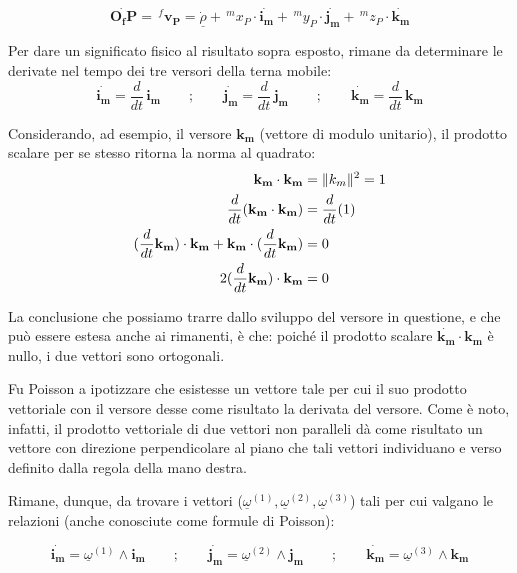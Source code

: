 				\begin{equation*}
					\dot{\mathbf{O_fP}} = \,^f\mathbf{v_P} = \dot{\underline{\rho}} + \,^mx_P \cdot \dot{\mathbf{i_m}} + \,^my_P \cdot \dot{\mathbf{j_m}} + \,^mz_P \cdot \dot{\mathbf{k_m}}
				\end{equation*}
		
		Per dare un significato fisico al risultato sopra esposto, rimane da determinare le derivate nel tempo dei tre versori della terna mobile:
		\[ \dot{\mathbf{i_m}} = \frac{d}{dt} \,{\mathbf{i_m}} \qquad ; \qquad \dot{\mathbf{j_m}} = \frac{d}{dt} \,{\mathbf{j_m}}  \qquad ; \qquad \dot{\mathbf{k_m}} = \frac{d}{dt} \,{\mathbf{k_m}} \]

		Considerando, ad esempio, il versore $\mathbf{k_m}$ (vettore di modulo unitario), il prodotto scalare per se stesso ritorna la norma al quadrato:
		\begin{equation*}
		\begin{split}
			\mathbf{k_m} \cdot \mathbf{k_m} &= \lVert k_m\rVert^2 = 1\\
			\frac{d}{dt} (\mathbf{k_m} \cdot \mathbf{k_m}) &= \frac{d}{dt}(1)\\
			(\frac{d}{dt}\mathbf{k_m}) \cdot  \mathbf{k_m} +  \mathbf{k_m} \cdot (\frac{d}{dt}\mathbf{k_m}) &= 0\\
			2 (\frac{d}{dt}\mathbf{k_m}) \cdot \mathbf{k_m} &= 0
		\end{split}
		\end{equation*}
		
		La conclusione che possiamo trarre dallo sviluppo del versore in questione, e che può essere estesa anche ai rimanenti, è che: poiché il prodotto scalare $ \dot{\mathbf{k_m}} \cdot \mathbf{k_m}$ è nullo, i due vettori sono ortogonali.
		
		Fu Poisson a ipotizzare che esistesse un vettore tale per cui il suo prodotto vettoriale con il versore desse come risultato la derivata del versore. Come è noto, infatti, il prodotto vettoriale di due vettori non paralleli dà come risultato un vettore con direzione perpendicolare al piano che tali vettori individuano e verso definito dalla regola della mano destra.
		
		Rimane, dunque, da trovare i vettori ($\underline{\omega}^{(1)}, \underline{\omega}^{(2)}, \underline{\omega}^{(3)}$) tali per cui valgano le relazioni (anche conosciute come formule di Poisson):
		
		\[ \dot{\mathbf{i_m}} = \underline{\omega}^{(1)} \wedge{\mathbf{i_m}} \qquad ; \qquad \dot{\mathbf{j_m}} =\underline{\omega}^{(2)} \wedge {\mathbf{j_m}}  \qquad ; \qquad \dot{\mathbf{k_m}} = \underline{\omega}^{(3)} \wedge {\mathbf{k_m}} \]
		
